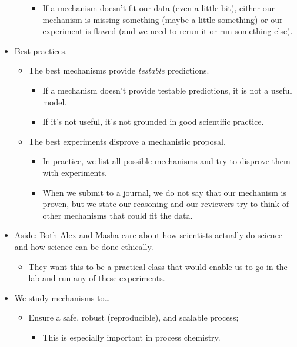 \documentclass[../notes.tex]{subfiles}
\begin{document}
\begin{itemize}
\begin{itemize}
        \begin{itemize}
            \item If a mechanism doesn't fit our data (even a little bit), either our mechanism is missing something (maybe a little something) or our experiment is flawed (and we need to rerun it or run something else).
        \end{itemize}
    \end{itemize}
    \item Best practices.
    \begin{itemize}
        \item The best mechanisms provide \emph{testable} predictions.
        \begin{itemize}
            \item If a mechanism doesn't provide testable predictions, it is not a useful model.
            \item If it's not useful, it's not grounded in good scientific practice.
        \end{itemize}
        \item The best experiments disprove a mechanistic proposal.
        \begin{itemize}
            \item In practice, we list all possible mechanisms and try to disprove them with experiments.
            \item When we submit to a journal, we do not say that our mechanism is proven, but we state our reasoning and our reviewers try to think of other mechanisms that could fit the data.
        \end{itemize}
    \end{itemize}
    \item Aside: Both Alex and Masha care about how scientists actually do science and how science can be done ethically.
    \begin{itemize}
        \item They want this to be a practical class that would enable us to go in the lab and run any of these experiments.
    \end{itemize}
    \item We study mechanisms to\dots
    \begin{itemize}
        \item Ensure a safe, robust (reproducible), and scalable process;
        \begin{itemize}
            \item This is especially important in process chemistry.

\end{itemize}
\end{itemize}
\end{itemize}
\end{document}
